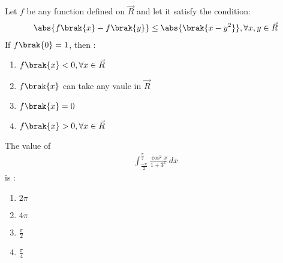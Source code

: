\item Let $f$ be any function defined on $\vec{R}$ and let it satisfy the condition: 
	\begin{align}
		\abs{f\brak{x} - f\brak{y}} \le \abs{\brak{x - y^2}}, \forall x, y \in \vec{R}
	\end{align} 
		If $f\brak{0} = 1$, then :
		\hfill{}
		\begin{enumerate}
			\item $f\brak{x} < 0, \forall x \in \vec{R}$
			\item $f\brak{x}$ can take any vaule in $\vec{R}$
			\item $f\brak{x} = 0$
			\item $f\brak{x} > 0, \forall x \in \vec{R}$
		\end{enumerate}
\item The value of
		\begin{align*}
			\int_{\frac{-\pi}{2}} ^ {\frac{\pi}{2}} \frac{\cos ^2 x}{1 + 3^x} \, dx
		\end{align*} is :
		\hfill{}
	\begin{multicols}{4}
		\begin{enumerate}
			\item $2\pi$ \columnbreak
			\item $4\pi$ \columnbreak
			\item $\frac{\pi}{2}$ \columnbreak
			\item $\frac{\pi}{4}$
		\end{enumerate}
	\end{multicols}
